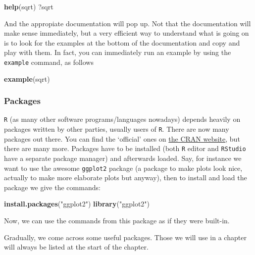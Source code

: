 \documentclass[]{article}
\newenvironment{Shaded}{\begin{snugshade}}{\end{snugshade}}
\newcommand{\KeywordTok}[1]{\textcolor[rgb]{0.13,0.29,0.53}{\textbf{{#1}}}}
\newcommand{\StringTok}[1]{\textcolor[rgb]{0.31,0.60,0.02}{{#1}}}
\newcommand{\NormalTok}[1]{{#1}}
\theoremstyle{definition}
\theoremstyle{definition}
\theoremstyle{definition}
\theoremstyle{remark}
\begin{document}
\begin{Shaded}
\begin{Highlighting}[]
\KeywordTok{help}\NormalTok{(sqrt)}
\NormalTok{?sqrt}
\end{Highlighting}
\end{Shaded}

And the appropiate documentation will pop up. Not that the documentation
will make sense immediately, but a very efficient way to understand what
is going on is to look for the examples at the bottom of the
documentation and copy and play with them. In fact, you can immediately
run an example by using the \texttt{example} command, as follows

\begin{Shaded}
\begin{Highlighting}[]
\KeywordTok{example}\NormalTok{(sqrt)}
\end{Highlighting}
\end{Shaded}

\subsubsection{Packages}\label{subsec:packages}

\texttt{R} (as many other software programs/languages nowadays) depends
heavily on packages written by other parties, usually users of
\texttt{R}. There are now many packages out there. You can find the
`official' ones on
\href{https://cran.r-project.org/web/packages/available_packages_by_name.html}{the
CRAN website}, but there are many more. Packages have to be installed
(both \texttt{R} editor and \texttt{RStudio} have a separate package
manager) and afterwards loaded. Say, for instance we want to use the
awesome \texttt{ggplot2} package (a package to make plots look nice,
actually to make more elaborate plots but anyway), then to install and
load the package we give the commands:

\begin{Shaded}
\begin{Highlighting}[]
\KeywordTok{install.packages}\NormalTok{(}\StringTok{"ggplot2"}\NormalTok{)}
\KeywordTok{library}\NormalTok{(}\StringTok{"ggplot2"}\NormalTok{)}
\end{Highlighting}
\end{Shaded}

Now, we can use the commands from this package as if they were built-in.

Gradually, we come across some useful packages. Those we will use in a
chapter will always be listed at the start of the chapter.
\end{document}

